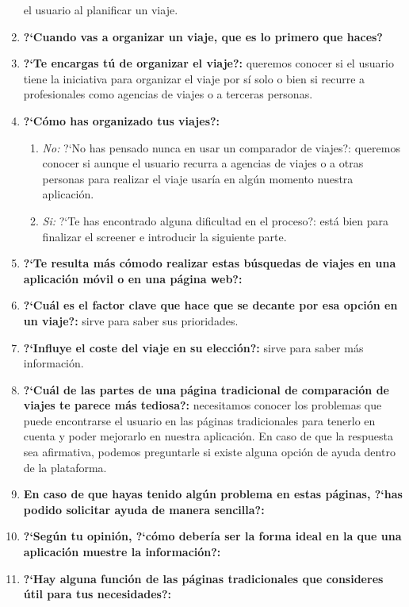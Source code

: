 \begin{enumerate}
                el usuario al planificar un viaje.
    \item {\textbf{?`Cuando vas a organizar un viaje, que es lo primero que haces?}}
    \item {\textbf{?`Te encargas tú de organizar el viaje?:}} queremos conocer si el usuario tiene la iniciativa para organizar el viaje por sí solo o bien si
                recurre a profesionales como agencias de viajes o a terceras personas.
    \item{ \textbf{?`Cómo has organizado tus viajes?:}}
    \begin{enumerate}
        \item {\textit{No:}} ?`No has pensado nunca en usar un comparador de viajes?: queremos conocer si aunque el usuario recurra a agencias de viajes o
                        a otras personas para realizar el viaje usaría en algún momento nuestra aplicación.
        \item {\textit{Si:}} ?`Te has encontrado alguna dificultad en el proceso?: está bien para finalizar el screener e introducir la siguiente parte.
    \end{enumerate}
    \item {\textbf{?`Te resulta más cómodo realizar estas búsquedas de viajes en una aplicación móvil o en una página web?:}}
    \item {\textbf{?`Cuál es el factor clave que hace que se decante por esa opción en un viaje?:}} sirve para saber sus prioridades.
    \item {\textbf{?`Influye el coste del viaje en su elección?:}} sirve para saber más información.
    \item {\textbf{?`Cuál de las partes de una página tradicional de comparación de viajes te parece más tediosa?:}} necesitamos conocer los problemas que
                puede encontrarse el usuario en las páginas tradicionales para tenerlo en cuenta y poder mejorarlo en nuestra aplicación. En caso de que
                la respuesta sea afirmativa, podemos preguntarle si existe alguna opción de ayuda dentro de la plataforma.
    \item {\textbf{En caso de que hayas tenido algún problema en estas páginas, ?`has podido solicitar ayuda de manera sencilla?:}}
    \item {\textbf{?`Según tu opinión, ?`cómo debería ser la forma ideal en la que una aplicación muestre la información?:}}
    \item {\textbf{?`Hay alguna función de las páginas tradicionales que consideres útil para tus necesidades?:}}

\end{enumerate}

